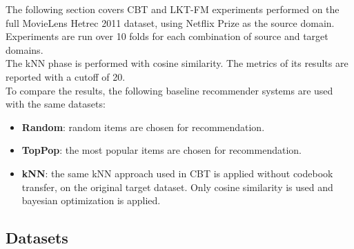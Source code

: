 The following section covers CBT and LKT-FM experiments performed on the full MovieLens Hetrec 2011 dataset, using Netflix Prize as the source domain.\\
Experiments are run over 10 folds for each combination of source and target domains.\\
The kNN phase is performed with cosine similarity. The metrics of its results are reported with a cutoff of 20.\\
To compare the results, the following baseline recommender systems are used with the same datasets:
\begin{itemize}
\item \textbf{Random}: random items are chosen for recommendation.
\item \textbf{TopPop}: the most popular items are chosen for recommendation.
\item \textbf{kNN}: the same kNN approach used in CBT is applied without codebook transfer, on the original target dataset. Only cosine similarity is used and bayesian optimization is applied.
\end{itemize}


\subsection{Datasets}

